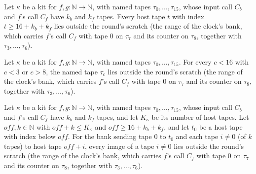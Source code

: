 \begin{theorem}
\label{Turing.NTimeDiag.qy_not_scratch_ge}
\leanok
{}
Let $\kappa$ be a kit for $f, g : \mathbb{N} \to \mathbb{N}$, with named tapes $\tau_0, \dots,
\tau_{15}$, whose input call $C_b$ and $f$'s call $C_f$ have $k_b$ and $k_f$ tapes. Every host tape
$t$ with index $t \ge 16 + k_b + k_f$ lies outside the round's scratch (the range of the clock's
bank, which carries $f$'s call $C_f$ with tape $0$ on $\tau_7$ and its counter on $\tau_8$,
together with $\tau_3, \dots, \tau_6$).
\end{theorem}

\begin{theorem}
\label{Turing.NTimeDiag.qy_not_scratch_tp}
\leanok
{}
Let $\kappa$ be a kit for $f, g : \mathbb{N} \to \mathbb{N}$, with named tapes $\tau_0, \dots,
\tau_{15}$. For every $c < 16$ with $c < 3$ or $c > 8$, the named tape $\tau_c$ lies outside the
round's scratch (the range of the clock's bank, which carries $f$'s call $C_f$ with tape $0$ on
$\tau_7$ and its counter on $\tau_8$, together with $\tau_3, \dots, \tau_6$).
\end{theorem}

\begin{theorem}
\label{Turing.NTimeDiag.qy_bank_not_scratch}
\leanok
{}
Let $\kappa$ be a kit for $f, g : \mathbb{N} \to \mathbb{N}$, with named tapes $\tau_0, \dots,
\tau_{15}$, whose input call $C_b$ and $f$'s call $C_f$ have $k_b$ and $k_f$ tapes, and let
$K_\kappa$ be its number of host tapes. Let $\mathit{off}, k \in \mathbb{N}$ with $\mathit{off} + k
\le K_\kappa$ and $\mathit{off} \ge 16 + k_b + k_f$, and let $t_0$ be a host tape with index below
$\mathit{off}$. For the bank sending tape $0$ to $t_0$ and each tape $i \ne 0$ (of $k$ tapes) to
host tape $\mathit{off} + i$, every image of a tape $i \ne 0$ lies outside the round's scratch (the
range of the clock's bank, which carries $f$'s call $C_f$ with tape $0$ on $\tau_7$ and its counter
on $\tau_8$, together with $\tau_3, \dots, \tau_6$).
\end{theorem}

